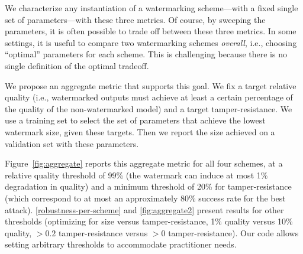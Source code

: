 %
We characterize any instantiation of a watermarking scheme---with a fixed single set of parameters---with these three metrics.
Of course, by sweeping the parameters, it is often possible to trade off between these three metrics.
%
In some settings, it is useful to compare two watermarking schemes \emph{overall}, i.e., choosing ``optimal'' parameters for each scheme.
%
This is challenging because there is no single definition of the optimal tradeoff.

%

%


We propose an aggregate metric that supports this goal.
We fix a target relative quality (i.e., watermarked outputs must achieve at least a certain percentage of the quality of the non-watermarked model) and a target tamper-resistance.
We use a training set to select the set of parameters that achieve the lowest watermark size, given these targets.
Then we report the size achieved on a validation set with these parameters.

Figure~\ref{fig:aggregate} reports this aggregate metric for all four schemes, at a relative quality threshold of 99\% (the watermark can induce at most 1\% degradation in quality) and a minimum threshold of 20\% for tamper-resistance (which correspond to at most an approximately 80\% success rate for the best attack).
%
\cref{robustness-per-scheme} and \cref{fig:aggregate2} present results for other thresholds (optimizing for size versus tamper-resistance, 1\% quality versus 10\% quality, $>0.2$ tamper-resistance versus $>0$ tamper-resistance). 
Our code allows setting arbitrary thresholds to accommodate practitioner needs. 

